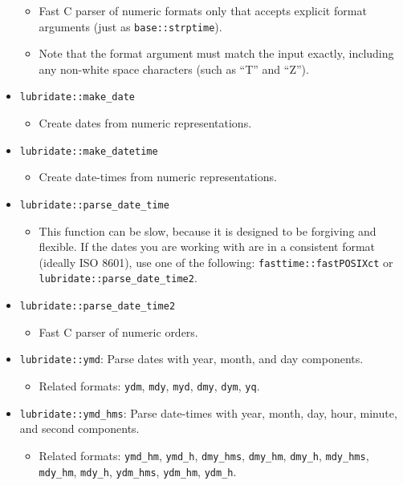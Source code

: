 \documentclass[
]{book}
\providecommand{\tightlist}{%
  \setlength{\itemsep}{0pt}\setlength{\parskip}{0pt}}
\begin{document}
\begin{itemize}
  \begin{itemize}
  \tightlist
  \item
    Fast C parser of numeric formats only that accepts explicit format arguments (just as \texttt{base::strptime}).
  \item
    Note that the format argument must match the input exactly, including any non-white space characters (such as ``T'' and ``Z'').
  \end{itemize}
\item
  \texttt{lubridate::make\_date}

  \begin{itemize}
  \tightlist
  \item
    Create dates from numeric representations.
  \end{itemize}
\item
  \texttt{lubridate::make\_datetime}

  \begin{itemize}
  \tightlist
  \item
    Create date-times from numeric representations.
  \end{itemize}
\item
  \texttt{lubridate::parse\_date\_time}

  \begin{itemize}
  \tightlist
  \item
    This function can be slow, because it is designed to be forgiving and flexible. If the dates you are working with are in a consistent format (ideally ISO 8601), use one of the following: \texttt{fasttime::fastPOSIXct} or \texttt{lubridate::parse\_date\_time2}.
  \end{itemize}
\item
  \texttt{lubridate::parse\_date\_time2}

  \begin{itemize}
  \tightlist
  \item
    Fast C parser of numeric orders.
  \end{itemize}
\item
  \texttt{lubridate::ymd}: Parse dates with year, month, and day components.

  \begin{itemize}
  \tightlist
  \item
    Related formats: \texttt{ydm}, \texttt{mdy}, \texttt{myd}, \texttt{dmy}, \texttt{dym}, \texttt{yq}.
  \end{itemize}
\item
  \texttt{lubridate::ymd\_hms}: Parse date-times with year, month, day, hour, minute, and second components.

  \begin{itemize}
  \tightlist
  \item
    Related formats: \texttt{ymd\_hm}, \texttt{ymd\_h}, \texttt{dmy\_hms}, \texttt{dmy\_hm}, \texttt{dmy\_h}, \texttt{mdy\_hms}, \texttt{mdy\_hm}, \texttt{mdy\_h}, \texttt{ydm\_hms}, \texttt{ydm\_hm}, \texttt{ydm\_h}.
  \end{itemize}
\end{itemize}
\end{document}
